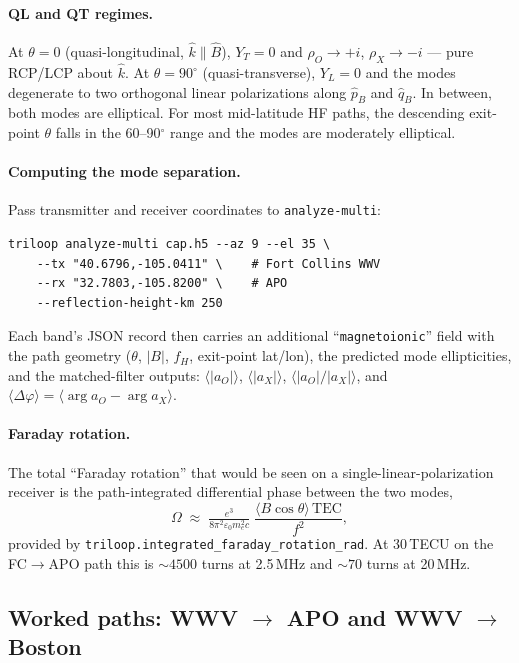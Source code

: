 \documentclass[11pt]{article}
\begin{document}
\paragraph{QL and QT regimes.}  At $\theta = 0$ (quasi-longitudinal,
$\hat k \parallel \hat B$), $Y_T = 0$ and $\rho_O \to +i$,
$\rho_X \to -i$ --- pure RCP/LCP about $\hat k$.  At $\theta = 90^\circ$
(quasi-transverse), $Y_L = 0$ and the modes degenerate to two
orthogonal linear polarizations along $\hat p_B$ and $\hat q_B$.  In
between, both modes are elliptical.  For most mid-latitude HF paths,
the descending exit-point $\theta$ falls in the 60--90$^\circ$ range
and the modes are moderately elliptical.

\paragraph{Computing the mode separation.}  Pass transmitter and
receiver coordinates to \texttt{analyze-multi}:

\begin{lstlisting}[style=shell]
triloop analyze-multi cap.h5 --az 9 --el 35 \
    --tx "40.6796,-105.0411" \    # Fort Collins WWV
    --rx "32.7803,-105.8200" \    # APO
    --reflection-height-km 250
\end{lstlisting}

Each band's JSON record then carries an additional
``\texttt{magnetoionic}'' field with the path geometry
($\theta$, $|B|$, $f_H$, exit-point lat/lon), the predicted mode
ellipticities, and the matched-filter outputs:
$\langle |a_O|\rangle$, $\langle |a_X|\rangle$,
$\langle |a_O|/|a_X|\rangle$, and
$\langle\Delta\varphi\rangle = \langle\arg a_O - \arg a_X\rangle$.

\paragraph{Faraday rotation.}  The total ``Faraday rotation'' that
would be seen on a single-linear-polarization receiver is the
path-integrated differential phase between the two modes,
\[
\Omega \;\approx\; \tfrac{e^3}{8\pi^2\varepsilon_0 m_e^2 c}\;
        \frac{\langle B\cos\theta\rangle\,\mathrm{TEC}}{f^2},
\]
provided by \texttt{triloop.integrated\_faraday\_rotation\_rad}.  At
30\,TECU on the FC$\to$APO path this is $\sim 4500$ turns at 2.5\,MHz
and $\sim 70$ turns at 20\,MHz.

\subsection{Worked paths: WWV $\to$ APO and WWV $\to$ Boston}
\label{sec:worked-paths}
\end{document}
